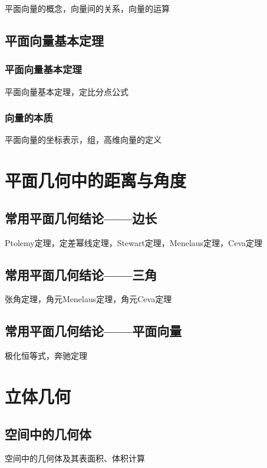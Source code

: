 \documentclass[lang=cn, zihao=4.5]{elegantbook}
\begin{document}
平面向量的概念，向量间的关系，向量的运算

\section{平面向量基本定理}

\subsection{平面向量基本定理}

平面向量基本定理，定比分点公式

\subsection{向量的本质}

平面向量的坐标表示，组，高维向量的定义

\chapter{平面几何中的距离与角度}

\section{常用平面几何结论——边长}

Ptolemy定理，定差幂线定理，Stewart定理，Menelaus定理，Ceva定理

\section{常用平面几何结论——三角}

张角定理，角元Menelaus定理，角元Ceva定理

\section{常用平面几何结论——平面向量}

极化恒等式，奔驰定理

\chapter{立体几何}

\section{空间中的几何体}

空间中的几何体及其表面积、体积计算
\end{document}
